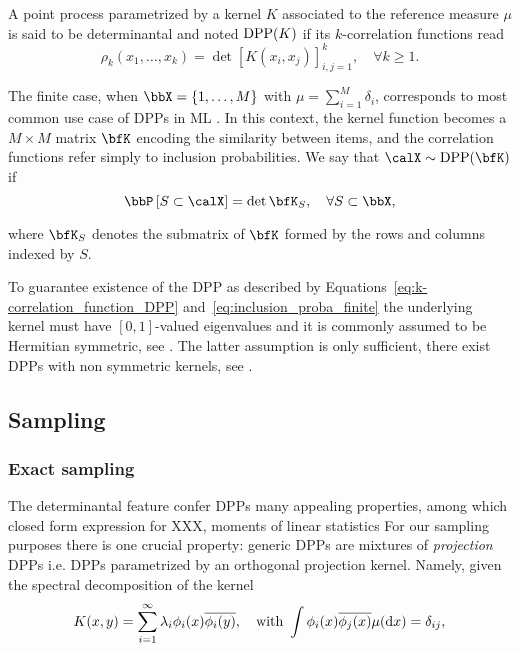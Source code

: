 \documentclass[twoside,11pt]{article}
\begin{document}
    A point process parametrized by a kernel $K$ associated to the reference measure $\mu$ is said to be determinantal and noted $\operatorname{DPP}(K)$ if its $k$-correlation functions read
    \begin{equation}
    \label{eq:k-correlation_function_DPP}
      \rho_k(x_1,\dots,x_k) 
        = \det [K(x_i, x_j)]_{i,j=1}^k,
      \quad \forall k\geq 1.
    \end{equation}

    The finite case, when $\bbX = \lrcb{1,\dots,M}$ with $\mu=\sum_{i=1}^M \delta_i$, corresponds to most common use case of DPPs in ML \citep{KuTa12}.
    In this context, the kernel function becomes a $M\times M$ matrix $\bfK$ encoding the similarity between items, and the correlation functions refer simply to inclusion probabilities.
    We say that $\calX\sim \DPP(\bfK)$ if
    \begin{equation}
    \label{eq:inclusion_proba_finite}
      \Proba{S \subset \calX} = \det \bfK_S, 
        \quad\forall S\subset \bbX,
    \end{equation}

    where $\bfK_S$ denotes the submatrix of $\bfK$ formed by the rows and columns indexed by $S$.

    To guarantee existence of the DPP as described by Equations~\ref{eq:k-correlation_function_DPP} and~\ref{eq:inclusion_proba_finite} the underlying kernel must have $[0,1]$-valued eigenvalues and it is commonly assumed to be Hermitian symmetric, see \citep[Theorem 3]{Sos00}.
    The latter assumption is only sufficient, there exist DPPs with non symmetric kernels, see \citep{BoDiFu09}.

  \subsection{Sampling} %
  \label{sub:sampling}
  
    \subsubsection{Exact sampling} %
    \label{ssub:exact_sampling}

      The determinantal feature confer DPPs many appealing properties, among which closed form expression for XXX, moments of linear statistics \etc
      For our sampling purposes there is one crucial property: generic DPPs are mixtures of \textit{projection} DPPs i.e. DPPs parametrized by an orthogonal projection kernel.
      Namely, given the spectral decomposition of the kernel 
      \begin{equation}
      \label{eq:eigdec_kernel}
        K(x,y)=\sum\limits_{i=1}^{\infty} \lambda_i \phi_i(x) \overline{\phi_i(y)},
        \quad \text{with }
        \int \phi_i(x) \overline{\phi_j(x)} \mu(\mathop{}\!\mathrm{d} x) = \delta_{ij},
      \end{equation}
\end{document}
